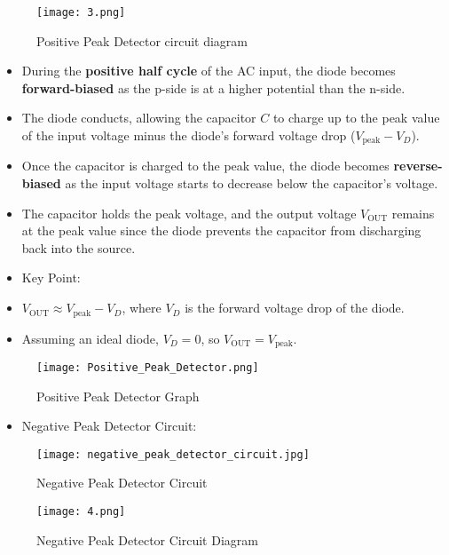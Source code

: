 \documentclass[9pt,conference]{IEEEtran}
\begin{document}
\begin{figure}[H]
    \centering
    \texttt{[image: 3.png]}
    \caption{Positive Peak Detector circuit diagram}
    \label{fig:positive_clamper}
\end{figure}

\begin{itemize}
    \item During the \textbf{positive half cycle} of the AC input, the diode becomes \textbf{forward-biased} as the p-side is at a higher potential than the n-side.
    \item The diode conducts, allowing the capacitor \( C \) to charge up to the peak value of the input voltage minus the diode's forward voltage drop (\( V_{\text{peak}} - V_D \)).
    \item Once the capacitor is charged to the peak value, the diode becomes \textbf{reverse-biased} as the input voltage starts to decrease below the capacitor's voltage.
    \item The capacitor holds the peak voltage, and the output voltage \( V_{\text{OUT}} \) remains at the peak value since the diode prevents the capacitor from discharging back into the source.
    \item Key Point:
    \item \( V_{\text{OUT}} \approx V_{\text{peak}} - V_D \), where \( V_D \) is the forward voltage drop of the diode.
    \item Assuming an ideal diode, \( V_D = 0 \), so \( V_{\text{OUT}} = V_{\text{peak}} \).
\end{itemize}

\begin{figure}[H]
    \centering
    \texttt{[image: Positive\_Peak\_Detector.png]}
    \caption{Positive Peak Detector Graph}
    \label{fig:positive_clamper}
\end{figure}


\begin{itemize}
    \item Negative Peak Detector Circuit:
\end{itemize}
\begin{figure}[H]
    \centering
    \texttt{[image: negative\_peak\_detector\_circuit.jpg]}
    \caption{Negative Peak Detector Circuit}
    \label{fig:negative_clamper}
\end{figure}
\begin{figure}[H]
    \centering
    \texttt{[image: 4.png]}
    \caption{Negative Peak Detector Circuit Diagram}
    \label{fig:positive_clamper}
\end{figure}
\end{document}
